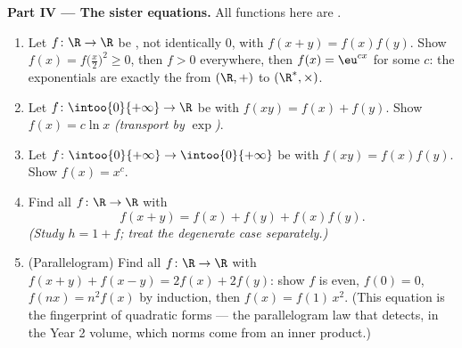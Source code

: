 \begin{problem}[{Weekend problem --- $f(x + y) = f(x) + f(y)$:
regularity forces linearity, and the portrait of the monsters}]
\medskip
\noindent\textbf{Part IV --- The sister equations.} All
functions here are .
\begin{enumerate}[resume]
  \item Let $f \colon \R \to \R$ be , not identically
        $0$, with $f(x + y) = f(x)f(y)$. Show $f(x) =
        f\bigl(\frac x2\bigr)^2 \geq 0$, then $f > 0$ everywhere,
        then $f(x) = \eu^{cx}$ for some $c$: the exponentials
        are exactly the   from $(\R, +)$ to
        $(\R^*, \times)$.
  \item Let $f \colon \intoo{0}{+\infty} \to \R$ be 
        with $f(xy) = f(x) + f(y)$. Show $f(x) = c\ln x$
        \emph{(transport by $\exp$)}.
  \item Let $f \colon \intoo{0}{+\infty} \to \intoo{0}{+\infty}$
        be  with $f(xy) = f(x)f(y)$. Show $f(x) = x^c$.
  \item Find all  $f \colon \R \to \R$ with
        \[
        f(x + y) = f(x) + f(y) + f(x)f(y) .
        \]
        \emph{(Study $h = 1 + f$; treat the degenerate case
        separately.)}
  \item (Parallelogram) Find all  $f \colon \R \to \R$
        with $f(x + y) + f(x - y) = 2f(x) + 2f(y)$: show $f$ is
        even, $f(0) = 0$, $f(nx) = n^2 f(x)$ by induction, then
        $f(x) = f(1)\,x^2$. (This equation is the fingerprint of
        quadratic forms --- the parallelogram law that detects,
        in the Year 2 volume, which norms come from an inner
        product.)
\end{enumerate}


\end{problem}
